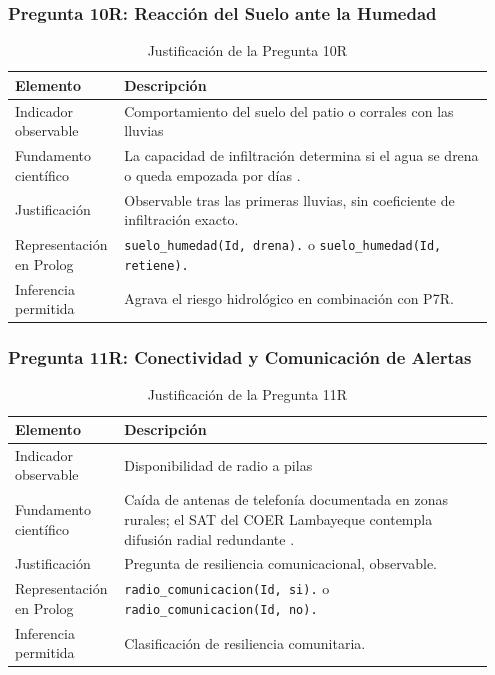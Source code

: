 \documentclass[12pt, letterpaper]{article}
\begin{document}
\subsubsection*{Pregunta 10R: Reacción del Suelo ante la Humedad}
\begin{table}[H]
\centering
\caption{Justificación de la Pregunta 10R}
\label{tab:p10r}
\begin{tabular}{@{}p{0.2\linewidth}p{0.75\linewidth}@{}}
\toprule
\textbf{Elemento} & \textbf{Descripción} \\ \midrule
Indicador observable & Comportamiento del suelo del patio o corrales con las lluvias \\
Fundamento científico & La capacidad de infiltración determina si el agua se drena o queda empozada por días \parencite{cenepred_jornada}. \\
Justificación & Observable tras las primeras lluvias, sin coeficiente de infiltración exacto. \\
Representación en Prolog & \texttt{suelo\_humedad(Id, drena).} o \texttt{suelo\_humedad(Id, retiene).} \\
Inferencia permitida & Agrava el riesgo hidrológico en combinación con P7R. \\ \bottomrule
\end{tabular}
\end{table}

\subsubsection*{Pregunta 11R: Conectividad y Comunicación de Alertas}
\begin{table}[H]
\centering
\caption{Justificación de la Pregunta 11R}
\label{tab:p11r}
\begin{tabular}{@{}p{0.2\linewidth}p{0.75\linewidth}@{}}
\toprule
\textbf{Elemento} & \textbf{Descripción} \\ \midrule
Indicador observable & Disponibilidad de radio a pilas \\
Fundamento científico & Caída de antenas de telefonía documentada en zonas rurales; el SAT del COER Lambayeque contempla difusión radial redundante \parencite{cenepred_manual_evar}. \\
Justificación & Pregunta de resiliencia comunicacional, observable. \\
Representación en Prolog & \texttt{radio\_comunicacion(Id, si).} o \texttt{radio\_comunicacion(Id, no).} \\
Inferencia permitida & Clasificación de resiliencia comunitaria. \\ \bottomrule
\end{tabular}
\end{table}
\end{document}
